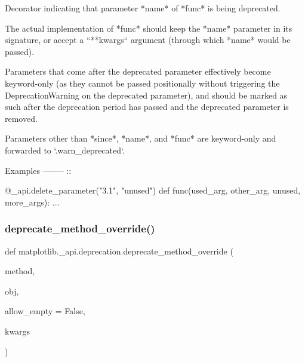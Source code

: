 \begin{DoxyVerb}Decorator indicating that parameter *name* of *func* is being deprecated.

The actual implementation of *func* should keep the *name* parameter in its
signature, or accept a ``**kwargs`` argument (through which *name* would be
passed).

Parameters that come after the deprecated parameter effectively become
keyword-only (as they cannot be passed positionally without triggering the
DeprecationWarning on the deprecated parameter), and should be marked as
such after the deprecation period has passed and the deprecated parameter
is removed.

Parameters other than *since*, *name*, and *func* are keyword-only and
forwarded to `.warn_deprecated`.

Examples
--------
::

    @_api.delete_parameter("3.1", "unused")
    def func(used_arg, other_arg, unused, more_args): ...
\end{DoxyVerb}
 \mbox{\label{namespacematplotlib_1_1__api_1_1deprecation_aae638184cd64ea398cc18609c1290674}} 
\subsubsection{\texorpdfstring{deprecate\+\_\+method\+\_\+override()}{deprecate\_method\_override()}}
{\footnotesize\ttfamily def matplotlib.\+\_\+api.\+deprecation.\+deprecate\+\_\+method\+\_\+override (\begin{DoxyParamCaption}\item[{}]{method,  }\item[{}]{obj,  }\item[{}]{allow\+\_\+empty = {\ttfamily False},  }\item[{}]{kwargs }\end{DoxyParamCaption})}

